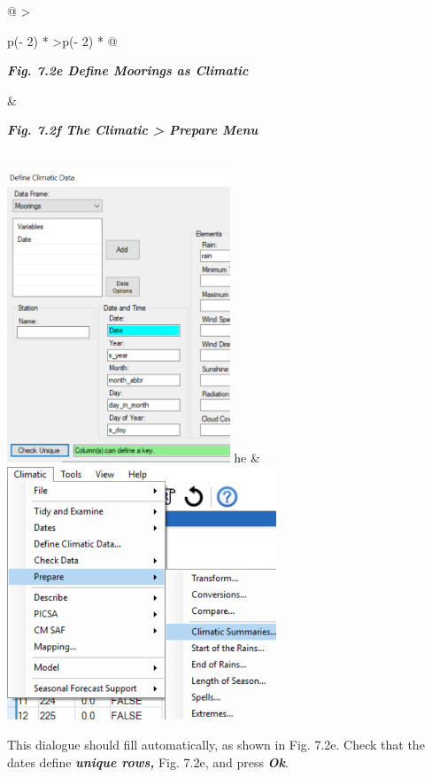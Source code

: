 \documentclass[
  letterpaper,
  DIV=11,
  numbers=noendperiod]{scrreprt}
\begin{document}
\begin{longtable}[]{@{}
  >{\raggedright\arraybackslash}p{(\columnwidth - 2\tabcolsep) * }
  >{\centering\arraybackslash}p{(\columnwidth - 2\tabcolsep) * }@{}}
\toprule\noalign{}
\begin{minipage}[b]{\linewidth}\raggedright
\textbf{\emph{Fig. 7.2e Define Moorings as Climatic}}
\end{minipage} & \begin{minipage}[b]{\linewidth}\centering
\textbf{\emph{Fig. 7.2f The Climatic \textgreater{} Prepare Menu}}
\end{minipage} \\
\midrule\noalign{}
\endhead
\bottomrule\noalign{}
\endlastfoot
\includegraphics[width=2.62074in,height=3.44835in]{figures/Fig7.2e.png}
he &
\includegraphics[width=3.16862in,height=\textheight]{figures/Fig7.2f.png} \\
\end{longtable}

This dialogue should fill automatically, as shown in Fig. 7.2e. Check
that the dates define \textbf{\emph{unique rows,}} Fig. 7.2e, and press
\textbf{\emph{Ok}}.
\end{document}
